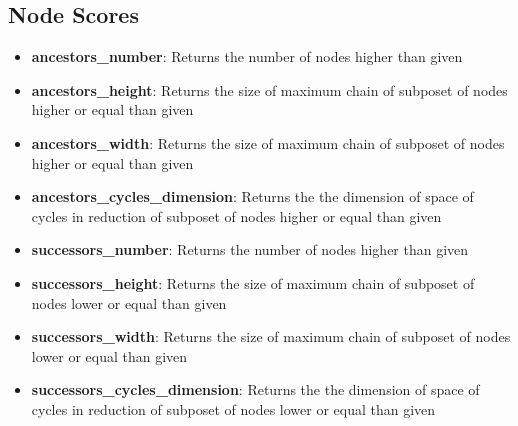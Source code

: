 \documentclass{article}
\begin{document}
\subsection{Node Scores}
\begin{itemize}
\item \textbf{ancestors\_number}: Returns the number of nodes higher than given
\item \textbf{ancestors\_height}: Returns the size of maximum chain of subposet of nodes higher or equal than given
\item \textbf{ancestors\_width}: Returns the size of maximum chain of subposet of nodes higher or equal than given
\item \textbf{ancestors\_cycles\_dimension}: Returns the the dimension of space of cycles in reduction of subposet of nodes higher or equal than given
\item \textbf{successors\_number}: Returns the number of nodes higher than given
\item \textbf{successors\_height}: Returns the size of maximum chain of subposet of nodes lower or equal than given
\item \textbf{successors\_width}: Returns the size of maximum chain of subposet of nodes lower or equal than given
\item \textbf{successors\_cycles\_dimension}: Returns the the dimension of space of cycles in reduction of subposet of nodes lower or equal than given
\end{itemize}
\end{document}
